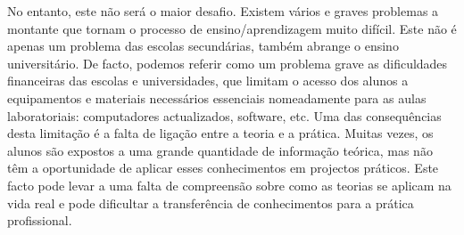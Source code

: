 No entanto, este não será o maior desafio. Existem vários e graves problemas a montante que tornam o processo de ensino/aprendizagem muito difícil. Este não é apenas um problema das escolas secundárias, também abrange o ensino universitário. De facto, podemos referir como um problema grave as dificuldades financeiras\cite{dificuldadesfinanciamento} \cite{Financiamentoprofissional} \cite{Educacaofinanciamento} das escolas e universidades, que limitam o acesso dos alunos a equipamentos e materiais necessários essenciais nomeadamente para as aulas laboratoriais: computadores actualizados, software, etc. Uma das consequências desta limitação é a falta de ligação entre a teoria e a prática. Muitas vezes, os alunos são expostos a uma grande quantidade de informação teórica, mas não têm a oportunidade de aplicar esses conhecimentos em projectos práticos. Este facto pode levar a uma falta de compreensão sobre como as teorias se aplicam na vida real e pode dificultar a transferência de conhecimentos para a prática profissional.












